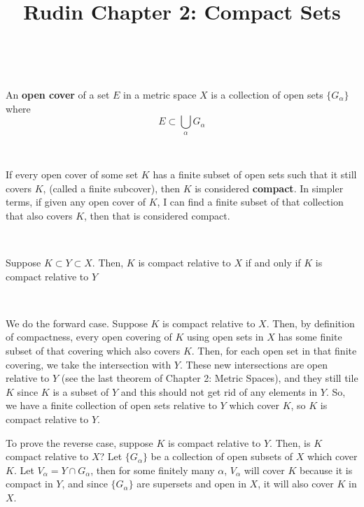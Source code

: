 \documentclass{article}
\title{Rudin Chapter 2: Compact Sets}
\begin{document}
\maketitle

\begin{definition}
\

An \textbf{open cover} of a set $E$ in a metric space $X$ is a collection of open sets $\{G_\alpha\}$ where $$E \subset \bigcup_\alpha G_\alpha$$ 
\end{definition}

\begin{definition}[Compactness]
\

If every open cover of some set $K$ has a finite subset of open sets such that it still covers $K$, (called a finite subcover), then $K$ is considered \textbf{compact}. In simpler terms, if given any open cover of $K$, I can find a finite subset of that collection that also covers $K$, then that is considered compact.
\end{definition}

\begin{theorem}
\

Suppose $K \subset Y \subset X$. Then, $K$ is compact relative to $X$ if and only if $K$ is compact relative to $Y$
\end{theorem}

\begin{customproof}
\

We do the forward case. Suppose $K$ is compact relative to $X$. Then, by definition of compactness, every open covering of $K$ using open sets in $X$ has some finite subset of that covering which also covers $K$. Then, for each open set in that finite covering, we take the intersection with $Y$. These new intersections are open relative to $Y$ (see the last theorem of Chapter 2: Metric Spaces), and they still tile $K$ since $K$ is a subset of $Y$ and this should not get rid of any elements in $Y$. So, we have a finite collection of open sets relative to $Y$ which cover $K$, so $K$ is compact relative to $Y$.

To prove the reverse case, suppose $K$ is compact relative to $Y$. Then, is $K$ compact relative to $X$? Let $\{G_\alpha\}$ be a collection of open subsets of $X$ which cover $K$. Let $V_\alpha = Y \cap G_\alpha$, then for some finitely many $\alpha$, $V_\alpha$ will cover $K$ because it is compact in $Y$, and since $\{G_\alpha\}$ are supersets and open in $X$, it will also cover $K$ in $X$.  
\end{customproof}
\end{document}
